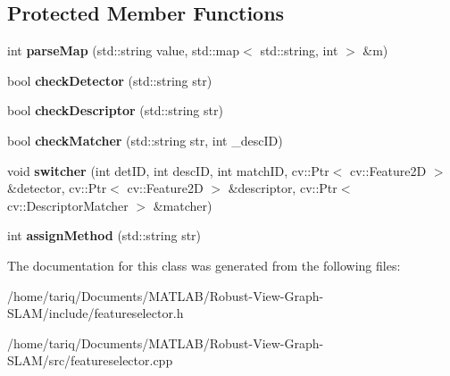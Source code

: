 \subsection*{Protected Member Functions}
\begin{DoxyCompactItemize}
\item 
int {\bfseries parse\+Map} (std\+::string value, std\+::map$<$ std\+::string, int $>$ \&m)\hypertarget{classFeatureSelector_a661d1a367c3b88a89ce0efe094baa64a}{}\label{classFeatureSelector_a661d1a367c3b88a89ce0efe094baa64a}

\item 
bool {\bfseries check\+Detector} (std\+::string str)\hypertarget{classFeatureSelector_a037cb04383dd308effd3f7605ac6a3c8}{}\label{classFeatureSelector_a037cb04383dd308effd3f7605ac6a3c8}

\item 
bool {\bfseries check\+Descriptor} (std\+::string str)\hypertarget{classFeatureSelector_a2913a660c607fd69bfdac130c5812ace}{}\label{classFeatureSelector_a2913a660c607fd69bfdac130c5812ace}

\item 
bool {\bfseries check\+Matcher} (std\+::string str, int \+\_\+desc\+ID)\hypertarget{classFeatureSelector_a40d109b2f6774cacb21a96f4dfb13af4}{}\label{classFeatureSelector_a40d109b2f6774cacb21a96f4dfb13af4}

\item 
void {\bfseries switcher} (int det\+ID, int desc\+ID, int match\+ID, cv\+::\+Ptr$<$ cv\+::\+Feature2D $>$ \&detector, cv\+::\+Ptr$<$ cv\+::\+Feature2D $>$ \&descriptor, cv\+::\+Ptr$<$ cv\+::\+Descriptor\+Matcher $>$ \&matcher)\hypertarget{classFeatureSelector_a20d8aa21ec7d99cffde7af05cee5bcbc}{}\label{classFeatureSelector_a20d8aa21ec7d99cffde7af05cee5bcbc}

\item 
int {\bfseries assign\+Method} (std\+::string str)\hypertarget{classFeatureSelector_aaa6c7cbea4869d53b44ef785d78d5063}{}\label{classFeatureSelector_aaa6c7cbea4869d53b44ef785d78d5063}

\end{DoxyCompactItemize}


The documentation for this class was generated from the following files\+:\begin{DoxyCompactItemize}
\item 
/home/tariq/\+Documents/\+M\+A\+T\+L\+A\+B/\+Robust-\/\+View-\/\+Graph-\/\+S\+L\+A\+M/include/featureselector.\+h\item 
/home/tariq/\+Documents/\+M\+A\+T\+L\+A\+B/\+Robust-\/\+View-\/\+Graph-\/\+S\+L\+A\+M/src/featureselector.\+cpp\end{DoxyCompactItemize}
